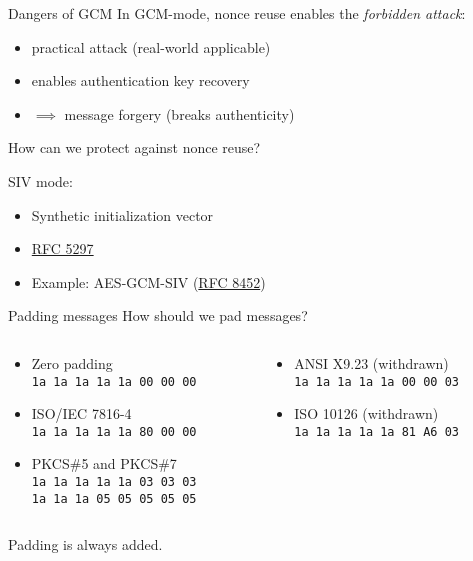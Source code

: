 \begin{frame}{Dangers of GCM}
  In GCM-mode, nonce reuse enables the \emph{forbidden attack}:
  \begin{itemize}[<+(1)->]
    \item practical attack (real-world applicable)
    \item enables authentication key recovery
    \item $\implies$ message forgery (breaks authenticity)
  \end{itemize}

  \pause
  How can we protect against nonce reuse?

  \pause
  SIV mode:
  \begin{itemize}[<+->]
    \item Synthetic initialization vector
    \item \href{https://datatracker.ietf.org/doc/html/rfc5297}{RFC 5297}
    \item Example: AES-GCM-SIV (\href{https://datatracker.ietf.org/doc/html/rfc8452}{RFC 8452})
  \end{itemize}
\end{frame}

\begin{frame}{Padding messages}
  How should we pad messages?

  \begin{columns}
    \begin{column}{0.5\textwidth}
      \begin{itemize}[<+(1)->]
        \item Zero padding\\
        \texttt{1a 1a 1a 1a 1a 00 00 00}
        \item ISO/IEC 7816-4\\
        \texttt{1a 1a 1a 1a 1a 80 00 00}
        \item PKCS\#5 and PKCS\#7\\
        \texttt{1a 1a 1a 1a 1a 03 03 03}\\
        \texttt{1a 1a 1a 05 05 05 05 05}
      \end{itemize}
    \end{column}
    \begin{column}{0.5\textwidth}
      \begin{itemize}[<+(1)->]
        \item ANSI X9.23 (withdrawn)\\
        \texttt{1a 1a 1a 1a 1a 00 00 03}
        \item ISO 10126 (withdrawn)\\
        \texttt{1a 1a 1a 1a 1a 81 A6 03}
      \end{itemize}
    \end{column}
  \end{columns}

  \vspace*{1em}

  \pause
  Padding is always added.
\end{frame}

